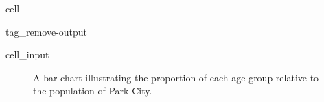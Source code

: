 \documentclass[letterpaper,10pt,english]{jupyterBook}
\begin{document}
\begin{sphinxuseclass}{cell}
\begin{sphinxuseclass}{tag_remove-output}\begin{sphinxVerbatimInput}

\begin{sphinxuseclass}{cell_input}
\begin{sphinxVerbatim}[commandchars=\\\{\}]

\end{sphinxVerbatim}

\end{sphinxuseclass}\end{sphinxVerbatimInput}

\end{sphinxuseclass}
\end{sphinxuseclass}
\begin{figure}[htbp]
\centering
\capstart

\noindent{}
\caption{A bar chart illustrating the proportion of each age group relative to the population of Park City.}\label{\detokenize{Ch1 Sampling and Data/1.4 Tables and Charts:park-city-barchart}}\end{figure}
\end{document}
